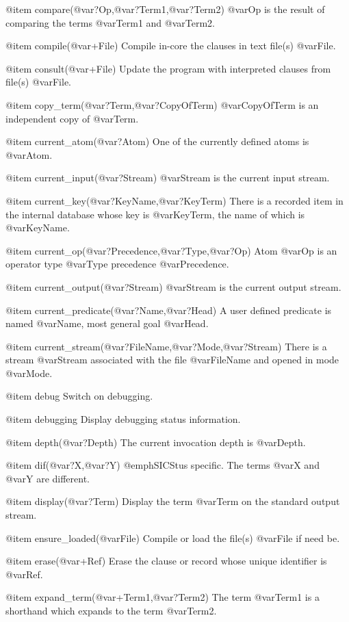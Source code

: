 {{{{{@item compare(@var{?Op},@var{?Term1},@var{?Term2})
@var{Op} is the result of comparing the terms @var{Term1} and @var{Term2}.

@item compile(@var{+File})
Compile in-core the clauses in text file(s) @var{File}.

@item consult(@var{+File})
Update the program with interpreted clauses from file(s) @var{File}.

@item copy_term(@var{?Term},@var{?CopyOfTerm})
@var{CopyOfTerm} is an independent copy of @var{Term}.

@item current_atom(@var{?Atom})
One of the currently defined atoms is @var{Atom}.

@item current_input(@var{?Stream})
@var{Stream} is the current input stream.

@item current_key(@var{?KeyName},@var{?KeyTerm})
There is a recorded item in the internal database whose key is
@var{KeyTerm}, the name of which is @var{KeyName}.

@item current_op(@var{?Precedence},@var{?Type},@var{?Op})
Atom @var{Op} is an operator type @var{Type} precedence
@var{Precedence}.

@item current_output(@var{?Stream})
@var{Stream} is the current output stream.

@item current_predicate(@var{?Name},@var{?Head})
A user defined predicate is named @var{Name}, most general goal
@var{Head}.

@item current_stream(@var{?FileName},@var{?Mode},@var{?Stream})
There is a stream @var{Stream} associated with the file @var{FileName}
and opened in mode @var{Mode}.

@item debug
Switch on debugging.

@item debugging
Display debugging status information.

@item depth(@var{?Depth})
The current invocation depth is @var{Depth}.

@item dif(@var{?X},@var{?Y})
@emph{SICStus specific.} The terms @var{X} and @var{Y} are different.

@item display(@var{?Term})
Display the term @var{Term} on the standard output stream.

@item ensure_loaded(@var{File})
Compile or load the file(s) @var{File} if need be.

@item erase(@var{+Ref})
Erase the clause or record whose unique identifier is @var{Ref}.

@item expand_term(@var{+Term1},@var{?Term2})
The term @var{Term1} is a shorthand which expands to the term
@var{Term2}.

}}}}}
